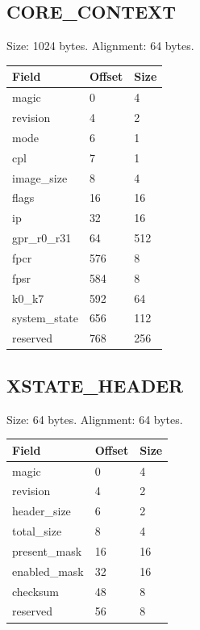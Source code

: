 \documentclass[10pt]{article}
\begin{document}
\subsection{CORE\_\allowbreak{}CONTEXT}
Size: 1024 bytes. Alignment: 64 bytes.
\begin{longtable}{@{}L{4cm}L{2cm}L{2cm}@{}}
\toprule Field & Offset & Size \\ \midrule
magic & 0 & 4 \\
revision & 4 & 2 \\
mode & 6 & 1 \\
cpl & 7 & 1 \\
image\_\allowbreak{}size & 8 & 4 \\
flags & 16 & 16 \\
ip & 32 & 16 \\
gpr\_\allowbreak{}r0\_\allowbreak{}r31 & 64 & 512 \\
fpcr & 576 & 8 \\
fpsr & 584 & 8 \\
k0\_\allowbreak{}k7 & 592 & 64 \\
system\_\allowbreak{}state & 656 & 112 \\
reserved & 768 & 256 \\
\bottomrule\end{longtable}
\subsection{XSTATE\_\allowbreak{}HEADER}
Size: 64 bytes. Alignment: 64 bytes.
\begin{longtable}{@{}L{4cm}L{2cm}L{2cm}@{}}
\toprule Field & Offset & Size \\ \midrule
magic & 0 & 4 \\
revision & 4 & 2 \\
header\_\allowbreak{}size & 6 & 2 \\
total\_\allowbreak{}size & 8 & 4 \\
present\_\allowbreak{}mask & 16 & 16 \\
enabled\_\allowbreak{}mask & 32 & 16 \\
checksum & 48 & 8 \\
reserved & 56 & 8 \\
\bottomrule\end{longtable}
\end{document}

